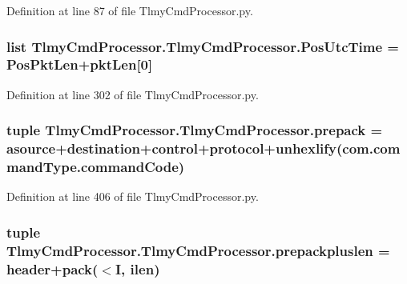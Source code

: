 Definition at line 87 of file Tlmy\+Cmd\+Processor.\+py.

\hypertarget{namespace_tlmy_cmd_processor_1_1_tlmy_cmd_processor_a06b32773af37ab235d62d22898dbb777}{}
\subsubsection[{Pos\+Utc\+Time}]{\setlength{\rightskip}{0pt plus 5cm}list Tlmy\+Cmd\+Processor.\+Tlmy\+Cmd\+Processor.\+Pos\+Utc\+Time = {\bf Pos\+Pkt\+Len}+{\bf pkt\+Len}\mbox{[}0\mbox{]}}\label{namespace_tlmy_cmd_processor_1_1_tlmy_cmd_processor_a06b32773af37ab235d62d22898dbb777}


Definition at line 302 of file Tlmy\+Cmd\+Processor.\+py.

\hypertarget{namespace_tlmy_cmd_processor_1_1_tlmy_cmd_processor_a081154c70ebc097a494acb04f62e01ca}{}
\subsubsection[{prepack}]{\setlength{\rightskip}{0pt plus 5cm}tuple Tlmy\+Cmd\+Processor.\+Tlmy\+Cmd\+Processor.\+prepack = {\bf asource}+{\bf destination}+{\bf control}+{\bf protocol}+unhexlify(com.\+command\+Type.\+command\+Code)}\label{namespace_tlmy_cmd_processor_1_1_tlmy_cmd_processor_a081154c70ebc097a494acb04f62e01ca}


Definition at line 406 of file Tlmy\+Cmd\+Processor.\+py.

\hypertarget{namespace_tlmy_cmd_processor_1_1_tlmy_cmd_processor_aac8bc88676dcbb49bca61e151fccf89a}{}
\subsubsection[{prepackpluslen}]{\setlength{\rightskip}{0pt plus 5cm}tuple Tlmy\+Cmd\+Processor.\+Tlmy\+Cmd\+Processor.\+prepackpluslen = {\bf header}+pack(\textquotesingle{}$<$I\textquotesingle{}, {\bf ilen})}\label{namespace_tlmy_cmd_processor_1_1_tlmy_cmd_processor_aac8bc88676dcbb49bca61e151fccf89a}



